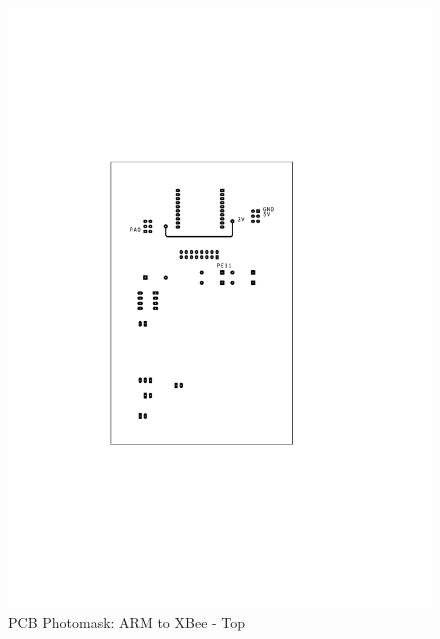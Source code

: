 \begin{figure}[H]
\begin{center}
\includegraphics[scale=0.6]{figures/ARM2XBee_top}
\end{center}
\caption{PCB Photomask: ARM to XBee - Top}
\label{fig:ARM2XBee3}
\end{figure}
